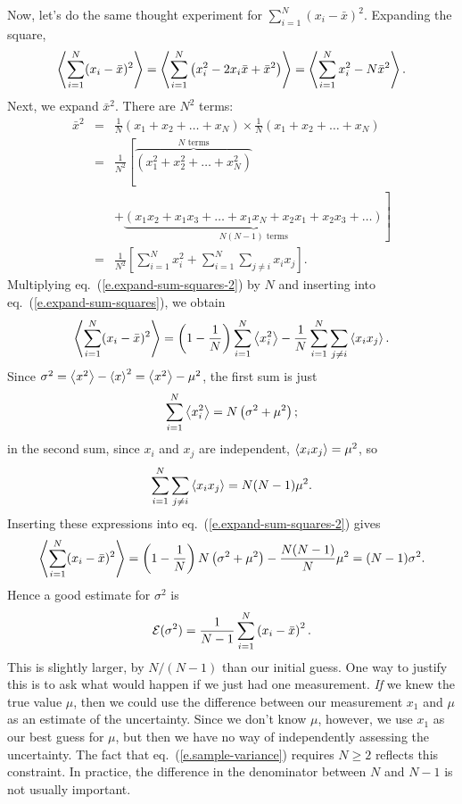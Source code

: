 Now, let's do the same thought experiment for $\sum_{i=1}^{N}(x_{i}-\bar{x})^{2}$. Expanding the square,
\begin{equation}\label{e.expand-sum-squares}
\left\langle\sum_{i=1}^{N}(x_{i}-\bar{x})^{2}\right\rangle = \left\langle\sum_{i=1}^{N}\left(x_{i}^{2} - 2 x_{i}\bar{x} + \bar{x}^{2}\right)\right\rangle = \left\langle\sum_{i=1}^{N}x_{i}^{2} - N\bar{x}^{2}\right\rangle.
\end{equation}
Next, we expand $\bar{x}^{2}$. There are $N^{2}$ terms: 
\begin{eqnarray}
\nonumber
	\bar{x}^{2} &=& \frac{1}{N} (x_{1}+x_{2}+\ldots+x_{N})\times\frac{1}{N}(x_{1}+x_{2}+\ldots+x_{N})\\
\nonumber
		&=& \frac{1}{N^{2}} \left[\overbrace{\left(x_{1}^{2}+x_{2}^{2}+\ldots+x_{N}^{2}\right)}^{\textrm{$N$ terms}}\right. \\
\nonumber
		&& + \left.\underbrace{\left(x_{1}x_{2}+x_{1}x_{3} + \ldots + x_{1}x_{N} + x_{2}x_{1} + x_{2}x_{3} + \ldots\right)}_{\textrm{$N(N-1)$ terms}}\right]\\
		&=& \frac{1}{N^{2}}\left[\sum_{i=1}^{N}x_{i}^{2} + \sum_{i=1}^{N}\sum_{j\neq i}x_{i}x_{j}\right].
\label{e.expand-sum-squares-2}
\end{eqnarray}
Multiplying eq.~(\ref{e.expand-sum-squares-2}) by $N$ and inserting into eq.~(\ref{e.expand-sum-squares}), we obtain
\[
\left\langle\sum_{i=1}^{N}(x_{i}-\bar{x})^{2}\right\rangle = \left(1-\frac{1}{N}\right)\sum_{i=1}^{N} \left\langle x_{i}^{2}\right\rangle - \frac{1}{N} \sum_{i=1}^{N}\sum_{j\neq i}\left\langle x_{i}x_{j}\right\rangle.
\]
Since $\sigma^{2} = \left\langle x^{2}\right\rangle-\left\langle x\right\rangle^{2} = \left\langle x^{2}\right\rangle-\mu^{2}$, the first sum is just
\[
\sum_{i=1}^{N}\left\langle x_{i}^{2}\right\rangle = N\left(\sigma^{2} + \mu^{2}\right);
\]
in the second sum, since $x_{i}$ and $x_{j}$ are independent, $\left\langle x_{i}x_{j}\right\rangle = \mu^{2}$, so
\[
\sum_{i=1}^{N}\sum_{j\neq i}\left\langle x_{i}x_{j}\right\rangle = N(N-1)\mu^{2}.
\]
Inserting these expressions into eq.~(\ref{e.expand-sum-squares-2}) gives
\[
\left\langle\sum_{i=1}^{N}(x_{i}-\bar{x})^{2}\right\rangle = \left(1-\frac{1}{N}\right)N\left(\sigma^{2} + \mu^{2}\right) - \frac{N(N-1)}{N}\mu^{2} = (N-1)\sigma^{2}.
\]
Hence a good estimate for $\sigma^{2}$ is
\begin{equation}\label{e.sample-variance}
\mathcal{E}(\sigma^{2}) = \frac{1}{N-1}\sum_{i=1}^{N}\left(x_{i}-\bar{x}\right)^{2}.
\end{equation}
This is slightly larger, by $N/(N-1)$ than our initial guess. One way to justify this is to ask what would happen if we just had one measurement. \emph{If} we knew the true value $\mu$, then we could use the difference between our measurement $x_{1}$ and $\mu$ as an estimate of the uncertainty. Since we don't know $\mu$, however, we use $x_{1}$ as our best guess for $\mu$, but then we have no way of independently assessing the uncertainty. The fact that eq.~(\ref{e.sample-variance}) requires $N\ge 2$ reflects this constraint.
In practice, the difference in the denominator between $N$ and $N-1$ is not usually important.


